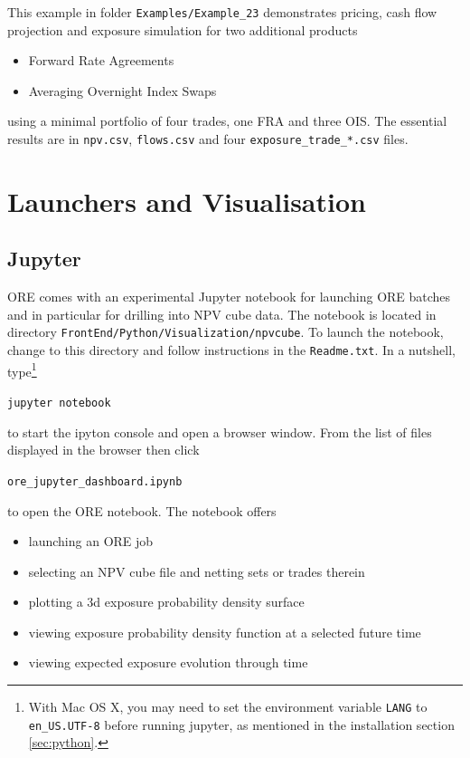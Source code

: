 \documentclass[12pt, a4paper]{article}
\begin{document}
This example in folder {\tt Examples/Example\_23} demonstrates pricing, cash flow projection and exposure simulation for two additional products
\begin{itemize}
\item Forward Rate Agreements
\item Averaging Overnight Index Swaps
\end{itemize}
using a minimal portfolio of four trades, one FRA and three OIS. The essential results are in {\tt npv.csv}, {\tt flows.csv} and 
four {\tt exposure\_trade\_*.csv} files.

\clearpage
\section{Launchers and Visualisation}\label{sec:visualisation}

\subsection{Jupyter}\label{sec:jupyter}

ORE comes with an experimental Jupyter notebook for launching ORE batches and in particular for drilling into NPV cube
data.  The notebook is located in directory {\tt FrontEnd/Python/Visualization/npvcube}. To launch the notebook, change
to this directory and follow instructions in the {\tt Readme.txt}. In a nutshell, type\footnote{With Mac OS X, you may
  need to set the environment variable {\tt LANG} to {\tt en\_US.UTF-8} before running jupyter, as mentioned in the
  installation section \ref{sec:python}.}

\medskip
\centerline{\tt jupyter notebook}
\medskip

to start the ipyton console and open a browser window. From the list of files displayed in the browser then click

\medskip
\centerline{\tt ore\_jupyter\_dashboard.ipynb} 
\medskip

to open the ORE notebook. The notebook offers
\begin{itemize}
\item launching an ORE job
\item selecting an NPV cube file and netting sets or trades therein
\item plotting a 3d exposure probability density surface
\item viewing exposure probability density function at a selected future time
\item viewing expected exposure evolution through time  
\end{itemize}
\end{document}

